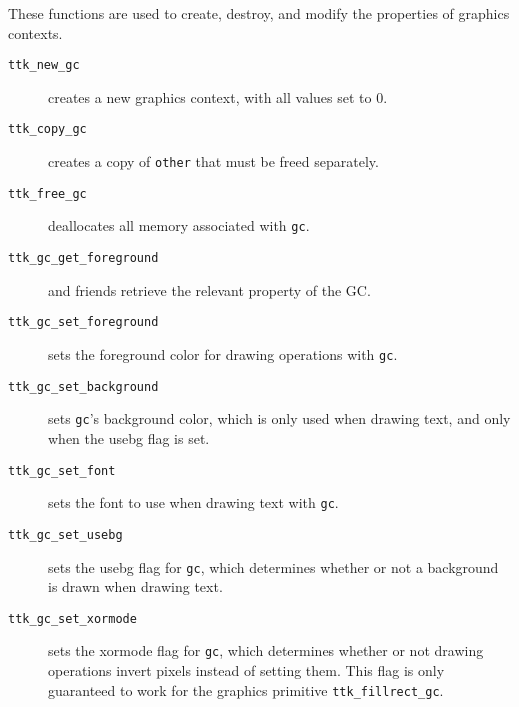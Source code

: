 \documentclass[12pt,letterpaper]{report}
\let\ttt\tt
\def\tt{\def\_{{\ttt\char`\_}}\ttt}
\begin{document}
These functions are used to create, destroy, and modify the properties of graphics contexts.

\begin{description}
\item[{\tt ttk_new_gc}] creates a new graphics context, with all values set to 0.
\item[{\tt ttk_copy_gc}] creates a copy of \verb|other| that must be freed separately.
\item[{\tt ttk_free_gc}] deallocates all memory associated with \verb|gc|.
\item[{\tt ttk_gc_get_foreground}] and friends retrieve the relevant property of the GC.
\item[{\tt ttk_gc_set_foreground}] sets the foreground color for drawing operations with \verb|gc|.
\item[{\tt ttk_gc_set_background}] sets \verb|gc|'s background color, which is only used when drawing text,
  and only when the {\sf usebg} flag is set.
\item[{\tt ttk_gc_set_font}] sets the font to use when drawing text with \verb|gc|.
\item[{\tt ttk_gc_set_usebg}] sets the {\sf usebg} flag for \verb|gc|, which determines whether or not
a background is drawn when drawing text.
\item[{\tt ttk_gc_set_xormode}] sets the {\sf xormode} flag for \verb|gc|, which determines whether or not
drawing operations invert pixels instead of setting them. This flag is only guaranteed to work for the graphics
primitive \verb|ttk_fillrect_gc|.
\end{description}
\end{document}
